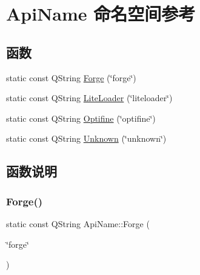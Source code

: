 \hypertarget{namespace_api_name}{}\section{Api\+Name 命名空间参考}
\label{namespace_api_name}
\subsection*{函数}
\begin{DoxyCompactItemize}
\item 
static const Q\+String \mbox{\hyperlink{namespace_api_name_a03256466f6fd247995c9784de39da7a1}{Forge}} (\char`\"{}forge\char`\"{})
\item 
static const Q\+String \mbox{\hyperlink{namespace_api_name_a3804590685a14efeed68a5de067c3838}{Lite\+Loader}} (\char`\"{}liteloader\char`\"{})
\item 
static const Q\+String \mbox{\hyperlink{namespace_api_name_a5c943268e20cd753b59d91454f0f707e}{Optifine}} (\char`\"{}optifine\char`\"{})
\item 
static const Q\+String \mbox{\hyperlink{namespace_api_name_a06f12ddbf1519480a0da3b625d28d90b}{Unknown}} (\char`\"{}unknown\char`\"{})
\end{DoxyCompactItemize}


\subsection{函数说明}
\mbox{\label{namespace_api_name_a03256466f6fd247995c9784de39da7a1}} 
\subsubsection{\texorpdfstring{Forge()}{Forge()}}
{\footnotesize\ttfamily static const Q\+String Api\+Name\+::\+Forge (\begin{DoxyParamCaption}\item[{\char`\"{}forge\char`\"{}}]{ }\end{DoxyParamCaption})\hspace{0.3cm}{\ttfamily [static]}}

\mbox{\label{namespace_api_name_a3804590685a14efeed68a5de067c3838}} 
